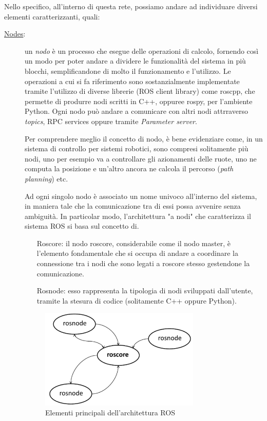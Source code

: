 Nello specifico, all'interno di questa rete, possiamo andare ad individuare diversi elementi caratterizzanti, quali:
\begin{description}
	\item[\underline{Nodes}:] un \emph{nodo} è un processo che esegue delle operazioni di calcolo, fornendo così un modo per poter andare a dividere le funzionalità del sistema in più blocchi, semplificandone di molto il funzionamento e l'utilizzo.
	Le operazioni a cui si fa riferimento sono sostanzialmente implementate tramite l'utilizzo di diverse librerie (ROS client library) come roscpp, che permette di produrre nodi scritti in C++, oppuree rospy, per l'ambiente Python.
	Ogni nodo può andare a comunicare con altri nodi attrraverso \emph{topics}, RPC services oppure tramite \emph{Parameter server}. 
	
	Per comprendere meglio il concetto di nodo, è bene evidenziare come, in un sistema di controllo per sistemi robotici, sono compresi solitamente più nodi, uno per esempio va a controllare gli azionamenti delle ruote, uno ne computa la posizione e un'altro ancora ne calcola il percorso (\emph{path planning}) etc.
	
	Ad ogni singolo nodo è associato un nome univoco all'interno del sistema, in maniera tale che la comunicazione tra di essi possa avvenire senza ambiguità.
	In particolar modo, l'architettura "a nodi" che caratterizza il sistema ROS si basa sul concetto di.
	\begin{itemize}
		\item[Roscore:] il nodo roscore, considerabile come il nodo master, è l'elemento fondamentale che si occupa di andare a coordinare la connessione tra i nodi che sono legati a roscore stesso gestendone la comunicazione.
		\item[Rosnode:] esso rappresenta la tipologia di nodi sviluppati dall'utente, tramite la stesura di codice (solitamente C++ oppure Python).
	\end{itemize}
	\begin{figure}[h]
		\centering
		\includegraphics[width=0.75\textwidth]{Immagini/Ros_Core_Node}
		\caption{Elementi principali dell'architettura ROS}
		\label{fig:RosCoreNode}
	\end{figure}


\end{description}
